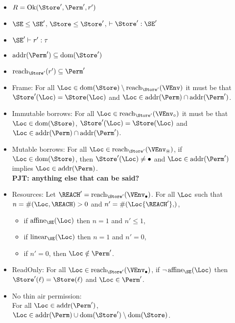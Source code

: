 \begin{theorem}
  \begin{itemize}
  \item
    $R = \Ok{\Store', \Perm', r'}$
  \item $\SE \le \SE'$, $\Store \le \Store'$,
    $\vdash \Store' : \SE'$
  \item $\SE' \vdash r' : \tau$
  \item $\Addresses{\Perm'} \subseteq \Dom{\Store'}$
  \item $\Reach{\Store'}{r'} \subseteq \Perm'$
  \item Frame: For all $\Loc \in \Dom{\Store} \setminus
    \Reach{\Store'}{\VEnv}$ it must be that
    $\Store' (\Loc) = \Store (\Loc)$
    and $\Loc\in\Addresses\Perm \cap \Addresses{\Perm'}$.
  \item Immutable borrows: For all $\Loc \in
    \Reach{\Store'}{\ImmutableBorrows\VEnv}$ it must be that
    $\Loc\in\Dom\Store$,
    $\Store' (\Loc) = \Store (\Loc)$
    and $\Loc\in\Addresses\Perm \cap \Addresses{\Perm'}$.
  \item Mutable borrows: For all $\Loc \in
    \Reach{\Store'}{\MutableBorrows\VEnv}$, if
    $\Loc\in\Dom\Store$, then 
    $\Store' (\Loc) \ne \StFreed$
    and $\Loc\in \Addresses{\Perm'}$ implies $\Loc\in
    \Addresses\Perm$.
    \\\textbf{PJT: anything else that can be said?}
  \item Resources:
    Let $\REACH' =\Reach{\Store'}{\Active\VEnv}$.
    For all $\Loc$ such that $n= \MultiNumber\Loc\REACH >0$ and $n' =
    \MultiNumber\Loc{\REACH'}$,
    \begin{itemize}
    \item if $\Affine{\SE}\Loc$ then $n=1$ and $n'\le 1$,
    \item if $\Linear{\SE}\Loc$ then $n=1$ and $n' = 0$,
    \item if $n'=0$, then $\Loc\notin\Perm'$.
    \end{itemize}
  \item ReadOnly: For all $\Loc \in \Reach
    {\Store'}{\Active\VEnv}$, if $\neg\Writeable{\SE}\Loc$ then
    $\Store' (\ell) = \Store (\ell)$ and $\Loc\in \Perm'$.
  \item No thin air permission: \\
    For all $\Loc\in \Addresses{\Perm'}$, $\Loc
    \in \Addresses\Perm \cup  \Dom{\Store'} \setminus \Dom{\Store}$.
  \end{itemize}
\end{theorem}


